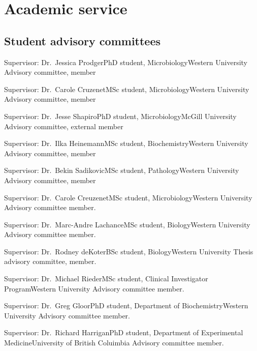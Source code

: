 \section {Academic service}

\subsection {Student advisory committees}

{Supervisor: Dr.~Jessica Prodger}{PhD student, Microbiology}{Western University}
{Advisory committee, member}

{Supervisor: Dr.~Carole Cruzenet}{MSc student, Microbiology}{Western University}
{Advisory committee, member}

{Supervisor: Dr.~Jesse Shapiro}{PhD student, Microbiology}{McGill University}
{Advisory committee, external member}


{Supervisor: Dr.~Ilka Heinemann}{MSc student, Biochemistry}{Western University}
{Advisory committee, member}

{Supervisor: Dr.~Bekin Sadikovic}{MSc student, Pathology}{Western University}
{Advisory committee, member}


{Supervisor: Dr.~Carole Creuzenet}{MSc student, Microbiology}{Western University}
{Advisory committee member.}

{Supervisor: Dr.~Marc-Andre Lachance}{MSc student, Biology}{Western University}
{Advisory committee member.}

{Supervisor: Dr.~Rodney deKoter}{BSc student, Biology}{Western University}
{Thesis advisory committee, member.}

{Supervisor: Dr.~Michael Rieder}{MSc student, Clinical Investigator Program}{Western University}
{Advisory committee member.} 

{Supervisor: Dr.~Greg Gloor}{PhD student, Department of Biochemistry}{Western University}
{Advisory committee member.}

{Supervisor: Dr.~Richard Harrigan}{PhD student, Department of Experimental Medicine}{University of British Coluimbia}
{Advisory committee member.}

